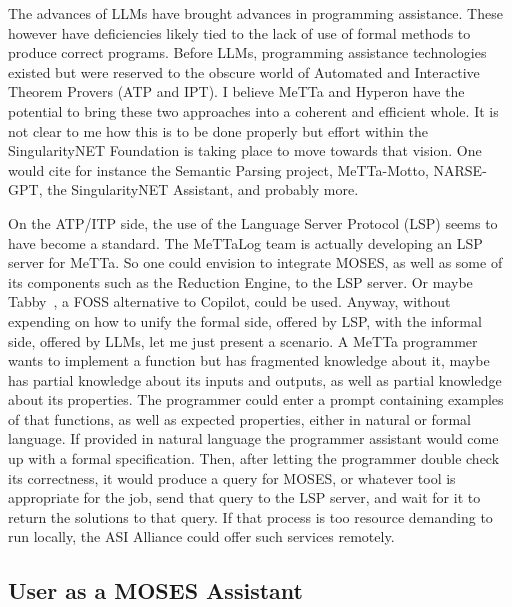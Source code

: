 \documentclass[]{report}
\begin{document}
The advances of LLMs have brought advances in programming assistance.
These however have deficiencies likely tied to the lack of use of
formal methods to produce correct programs.  Before LLMs, programming
assistance technologies existed but were reserved to the obscure world
of Automated and Interactive Theorem Provers (ATP and IPT).  I believe
MeTTa and Hyperon have the potential to bring these two approaches
into a coherent and efficient whole.  It is not clear to me how this
is to be done properly but effort within the SingularityNET Foundation
is taking place to move towards that vision.  One would cite for
instance the Semantic Parsing project, MeTTa-Motto, NARSE-GPT, the
SingularityNET Assistant, and probably more.

On the ATP/ITP side, the use of the Language Server Protocol (LSP)
seems to have become a standard.  The MeTTaLog team is actually
developing an LSP server for MeTTa.  So one could envision to
integrate MOSES, as well as some of its components such as the
Reduction Engine, to the LSP server.  Or maybe Tabby~\cite{Tabby}, a
FOSS alternative to Copilot, could be used.  Anyway, without expending
on how to unify the formal side, offered by LSP, with the informal
side, offered by LLMs, let me just present a scenario.  A MeTTa
programmer wants to implement a function but has fragmented knowledge
about it, maybe has partial knowledge about its inputs and outputs, as
well as partial knowledge about its properties.  The programmer could
enter a prompt containing examples of that functions, as well as
expected properties, either in natural or formal language.  If
provided in natural language the programmer assistant would come up
with a formal specification.  Then, after letting the programmer
double check its correctness, it would produce a query for MOSES, or
whatever tool is appropriate for the job, send that query to the LSP
server, and wait for it to return the solutions to that query.  If
that process is too resource demanding to run locally, the ASI
Alliance could offer such services remotely.

\subsection{User as a MOSES Assistant}
\end{document}
